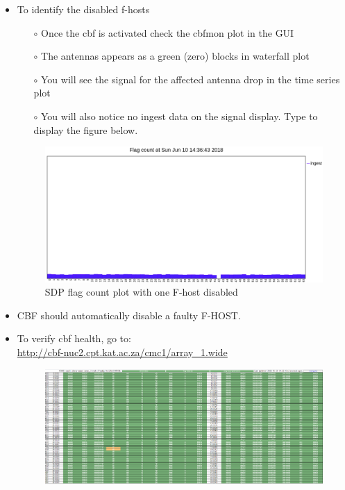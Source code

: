 \begin{itemize}
	\item {}To identify the disabled f-hosts
	
	\begin{itemize}
		\item[$\circ$] Once the cbf is activated check the cbfmon plot in the GUI
		\item[$\circ$] The antennas appears as a green (zero) blocks in waterfall plot
		\item[$\circ$] You will see the signal for the affected antenna drop in the time series plot
		\item[$\circ$] You will also notice no ingest data on the signal display.   Type  to display the figure below.
		
		
	\end{itemize}



 

\begin{figure}[!thb]
	\centering
	\includegraphics[scale=0.4]{Chapters/images/image20.png}
	
	\caption{SDP flag count plot with one F-host disabled}
	\label{fig:image20}
\end{figure}

\item{} CBF should automatically disable a faulty F-HOST.
\item{} To verify cbf health, go to:\\ \url{http://cbf-nuc2.cpt.kat.ac.za/cmc1/array_1.wide}

\begin{figure}[!thb]
	\centering
	\includegraphics[scale=0.22]{Chapters/images/image40.png}
	

\end{figure}
\end{itemize}
